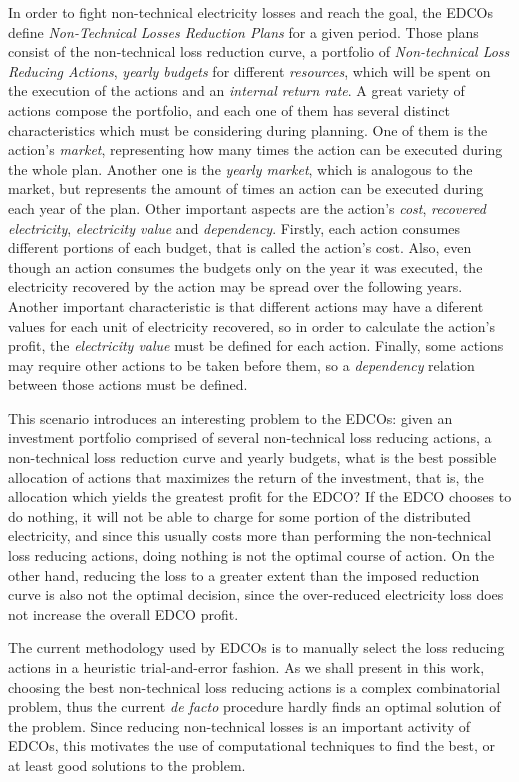 In order to fight non-technical electricity losses and reach the goal, the EDCOs define \textit{Non-Technical Losses Reduction Plans} 
for a given period. Those plans consist of the non-technical loss reduction curve, a portfolio of \textit{Non-technical Loss Reducing Actions}, 
\textit{yearly budgets} for different \textit{resources}, which will be spent on the execution of the actions and 
an \textit{internal return rate}. A great variety of actions compose the portfolio, and each one of them has several distinct 
characteristics which must be considering during planning. One of them is the action's \textit{market}, representing how many times 
the action can be executed during the whole plan. Another one is the \textit{yearly market}, which is analogous to the market, but represents the amount of
times an action can be executed during each year of the plan. Other important aspects are the action's \textit{cost}, \textit{recovered electricity}, \textit{electricity value} and 
\textit{dependency}. Firstly, each action consumes different portions of each budget, that is called the action's cost. Also, even though an action 
consumes the budgets only on the year it was executed, the electricity recovered by the action may be spread over the following years. Another important 
characteristic is that different actions may have a diferent values for each unit of electricity recovered, so in order to calculate the action's profit, 
the \textit{electricity value} must be defined for each action. Finally, some actions may require other actions to be taken before them, so a 
\textit{dependency} relation between those actions must be defined.

This scenario introduces an interesting problem to the EDCOs: given an investment portfolio comprised of 
several non-technical loss reducing actions, a non-technical loss reduction curve and yearly budgets, what is the best possible 
allocation of actions that maximizes the return of the investment, that is, the 
allocation which yields the greatest profit for the EDCO?
If the EDCO chooses to do nothing, it will not be able to charge for some portion of the
distributed electricity, and since this usually costs more 
than performing the non-technical loss reducing actions, doing nothing is not
the optimal course of action. On the other hand, reducing the loss to a greater extent than the
imposed reduction curve is also not the optimal decision, since the over-reduced electricity loss does not
increase the overall EDCO profit.

The current methodology used by EDCOs is to manually select the loss reducing actions in
a heuristic trial-and-error fashion. As we shall present in this work, choosing the best non-technical loss reducing actions is
a complex combinatorial problem, thus the current \textit{de facto} procedure hardly finds an optimal solution of the problem.
Since reducing non-technical losses is an important activity of EDCOs, this motivates the use of computational techniques to 
find the best, or at least good solutions to the problem.

